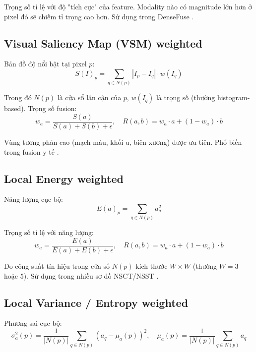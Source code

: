 \documentclass[12pt,a4paper]{article}
\begin{document}
Trọng số tỉ lệ với độ "tích cực" của feature. Modality nào có magnitude lớn hơn ở pixel đó sẽ chiếm tỉ trọng cao hơn. Sử dụng trong DenseFuse \cite{li2018densefuse}.

\subsection{Visual Saliency Map (VSM) weighted}

Bản đồ độ nổi bật tại pixel $p$:
\begin{equation}
S(I)_p = \sum_{q \in N(p)} |I_p - I_q| \cdot w(I_q)
\end{equation}

Trong đó $N(p)$ là cửa sổ lân cận của $p$, $w(I_q)$ là trọng số (thường histogram-based). Trọng số fusion:
\begin{equation}
w_a = \frac{S(a)}{S(a) + S(b) + \epsilon}, \quad R(a, b) = w_a \cdot a + (1 - w_a) \cdot b
\end{equation}

Vùng tương phản cao (mạch máu, khối u, biên xương) được ưu tiên. Phổ biến trong fusion y tế \cite{wang2008vsm, li2013guided}.

\subsection{Local Energy weighted}

Năng lượng cục bộ:
\begin{equation}
E(a)_p = \sum_{q \in N(p)} a_q^2
\end{equation}

Trọng số tỉ lệ với năng lượng:
\begin{equation}
w_a = \frac{E(a)}{E(a) + E(b) + \epsilon}, \quad R(a, b) = w_a \cdot a + (1 - w_a) \cdot b
\end{equation}

Đo công suất tín hiệu trong cửa sổ $N(p)$ kích thước $W \times W$ (thường $W = 3$ hoặc $5$). Sử dụng trong nhiều sơ đồ NSCT/NSST \cite{liu2017survey}.

\subsection{Local Variance / Entropy weighted}

Phương sai cục bộ:
\begin{equation}
\sigma^2_a(p) = \frac{1}{|N(p)|} \sum_{q \in N(p)} (a_q - \mu_a(p))^2, \quad \mu_a(p) = \frac{1}{|N(p)|} \sum_{q \in N(p)} a_q
\end{equation}
\end{document}
